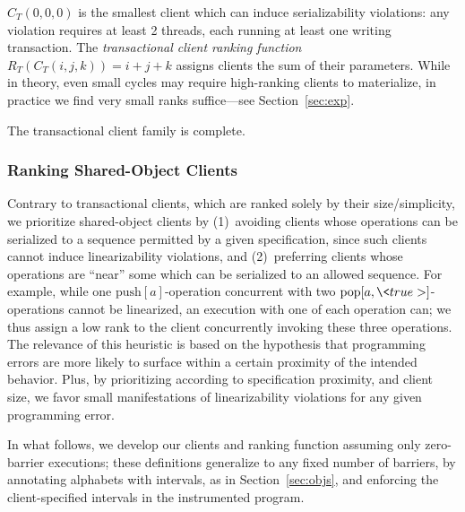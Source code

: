 $C_T(0,0,0)$ is the smallest client which can induce serializability
violations: any violation requires at least 2 threads, each running at least
one writing transaction. The \emph{transactional client ranking function} $R_T(
C_T(i,j,k) ) = i+j+k$ assigns clients the sum of their parameters. While in
theory, even small cycles may require high-ranking clients to materialize, in
practice we find very small ranks suffice---see Section~\ref{sec:exp}.

\begin{lemma}
  The transactional client family is complete.
\end{lemma}

\subsubsection{Ranking Shared-Object Clients}

Contrary to transactional clients, which are ranked solely by their
size/simplicity, we prioritize shared-object clients by (1)~avoiding clients
whose operations can be serialized to a sequence permitted by a given
specification, since such clients cannot induce linearizability violations, and
(2)~preferring clients whose operations are ``near'' some which can be
serialized to an allowed sequence. For example, while one
$\mathrm{push}[a]$-operation concurrent with two
$\mathrm{pop}[a,\<true>]$-operations cannot be linearized, an execution with
one of each operation can; we thus assign a low rank to the client concurrently
invoking these three operations. The relevance of this heuristic is based on
the hypothesis that programming errors are more likely to surface within a
certain proximity of the intended behavior. Plus, by prioritizing
according to specification proximity, and client size, we favor small
manifestations of linearizability violations for any given programming error.

In what follows, we develop our clients and ranking function assuming only
zero-barrier executions; these definitions generalize to any fixed number of
barriers, by annotating alphabets with intervals, as in Section~\ref{sec:objs},
and enforcing the client-specified intervals in the instrumented program.

